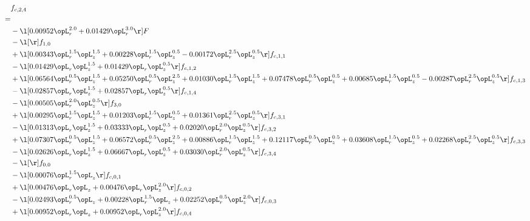 \begin{alignat}{2} 
\label{eq:f_24_1} 
& f_{c,2,4} \nonumber \\ 
 = \\ 
& - \l[  0.00952 \opL_r^{2.0} +  0.01429 \opL_r^{3.0}  \r] F \nonumber \\ 
& - \l[  \r] f_{1,0} \nonumber \\ 
& + \l[  0.00343 \opL_r^{1.5} \opL_z^{1.5} +  0.00228 \opL_r^{1.5} \opL_z^{0.5}   -0.00172 \opL_r^{2.5} \opL_z^{0.5}  \r] f_{c,1,1} \nonumber \\ 
& - \l[  0.01429 \opL_r \opL_z^{1.5} +  0.01429 \opL_r \opL_z^{0.5}  \r] f_{c,1,2} \nonumber \\ 
& + \l[  0.06564 \opL_r^{0.5} \opL_z^{1.5} +  0.05250 \opL_r^{0.5} \opL_z^{2.5} +  0.01030 \opL_r^{1.5} \opL_z^{1.5} +  0.07478 \opL_r^{0.5} \opL_z^{0.5} +  0.00685 \opL_r^{1.5} \opL_z^{0.5}   -0.00287 \opL_r^{2.5} \opL_z^{0.5}  \r] f_{c,1,3} \nonumber \\ 
& - \l[  0.02857 \opL_r \opL_z^{1.5} +  0.02857 \opL_r \opL_z^{0.5}  \r] f_{c,1,4} \nonumber \\ 
& - \l[  0.00505 \opL_r^{2.0} \opL_z^{0.5}  \r] f_{3,0} \nonumber \\ 
& + \l[  0.00295 \opL_r^{1.5} \opL_z^{1.5} +  0.01203 \opL_r^{1.5} \opL_z^{0.5} +  0.01361 \opL_r^{2.5} \opL_z^{0.5}  \r] f_{c,3,1} \nonumber \\ 
& - \l[  0.01313 \opL_r \opL_z^{1.5} +  0.03333 \opL_r \opL_z^{0.5} +  0.02020 \opL_r^{2.0} \opL_z^{0.5}  \r] f_{c,3,2} \nonumber \\ 
& + \l[  0.07307 \opL_r^{0.5} \opL_z^{1.5} +  0.06572 \opL_r^{0.5} \opL_z^{2.5} +  0.00886 \opL_r^{1.5} \opL_z^{1.5} +  0.12117 \opL_r^{0.5} \opL_z^{0.5} +  0.03608 \opL_r^{1.5} \opL_z^{0.5} +  0.02268 \opL_r^{2.5} \opL_z^{0.5}  \r] f_{c,3,3} \nonumber \\ 
& - \l[  0.02626 \opL_r \opL_z^{1.5} +  0.06667 \opL_r \opL_z^{0.5} +  0.03030 \opL_r^{2.0} \opL_z^{0.5}  \r] f_{c,3,4} \nonumber \\ 
& - \l[  \r] f_{0,0} \nonumber \\ 
& - \l[  0.00076 \opL_r^{1.5} \opL_z  \r] f_{c,0,1} \nonumber \\ 
& + \l[  0.00476 \opL_r \opL_z +  0.00476 \opL_r \opL_z^{2.0}  \r] f_{c,0,2} \nonumber \\ 
& - \l[  0.02493 \opL_r^{0.5} \opL_z +  0.00228 \opL_r^{1.5} \opL_z +  0.02252 \opL_r^{0.5} \opL_z^{2.0}  \r] f_{c,0,3} \nonumber \\ 
& + \l[  0.00952 \opL_r \opL_z +  0.00952 \opL_r \opL_z^{2.0}  \r] f_{c,0,4} \nonumber \\ 

\end{alignat}
